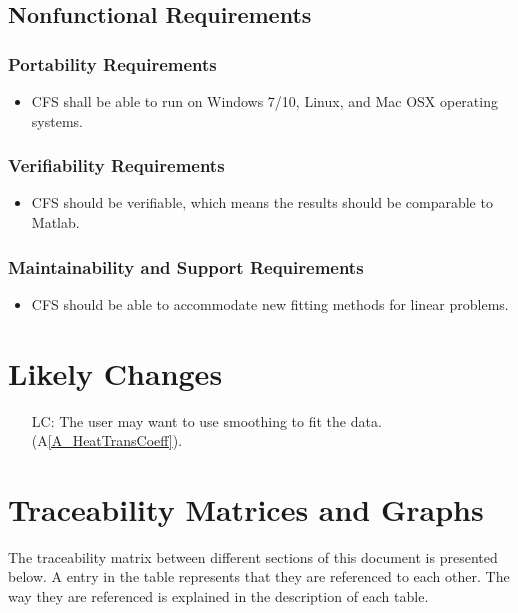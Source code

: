 \documentclass[12pt]{article}
\newcommand{\aref}[1]{A\ref{#1}}
\newcounter{lcnum} %
\newcommand{\famname}{CFS} %
\begin{document}
\subsection{Nonfunctional Requirements}

\subsubsection{Portability Requirements}
\begin{itemize}
	\item \famname{} shall be able to run on Windows 7/10, Linux, and Mac OSX
	operating systems.
\end{itemize}

\subsubsection{Verifiability Requirements}
\begin{itemize}
	\item \famname{} should be verifiable, which means the results should be comparable to Matlab.
\end{itemize}

\subsubsection{Maintainability and Support Requirements}
\begin{itemize}
	\item \famname{} should be able to accommodate new fitting methods for linear problems. 
\end{itemize}	
	


\section{Likely Changes}    

\noindent \begin{itemize}

\item[LC\refstepcounter{lcnum}\thelcnum\label{LC_Smoothing}:]The
user may want to use smoothing to fit the data.(\aref{A_HeatTransCoeff}). 

\end{itemize}

\section{Traceability Matrices and Graphs}
The traceability matrix between different sections of this document is presented below. A \checkmark entry in the table represents that they are referenced to each other. The way they are referenced is explained in the description of each table.
\end{document}
